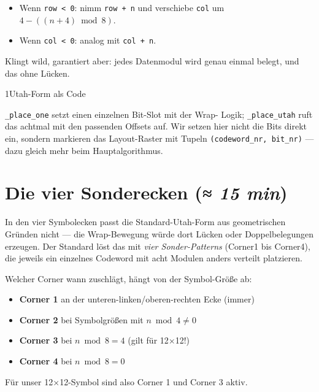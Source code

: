 \begin{itemize}
\item Wenn \texttt{row < 0}: nimm \texttt{row + n} und verschiebe
  \texttt{col} um $4 - ((n+4) \bmod 8)$.
\item Wenn \texttt{col < 0}: analog mit \texttt{col + n}.
\end{itemize}

Klingt wild, garantiert aber: jedes Datenmodul wird genau einmal
belegt, und das ohne Lücken.

\begin{pythoneinheit}{1}{Utah-Form als Code}

\texttt{\_place\_one} setzt einen einzelnen Bit-Slot mit der Wrap-
Logik; \texttt{\_place\_utah} ruft das achtmal mit den passenden
Offsets auf. Wir setzen hier nicht die Bits direkt ein, sondern
markieren das Layout-Raster mit Tupeln \texttt{(codeword\_nr, bit\_nr)}
— dazu gleich mehr beim Hauptalgorithmus.
\end{pythoneinheit}

\section{Die vier Sonderecken \normalfont(\textit{≈ 15 min})}

In den vier Symbolecken passt die Standard-Utah-Form aus geometrischen
Gründen nicht — die Wrap-Bewegung würde dort Lücken oder
Doppelbelegungen erzeugen. Der Standard löst das mit \emph{vier
Sonder-Patterns} (Corner1 bis Corner4), die jeweils ein einzelnes
Codeword mit acht Modulen anders verteilt platzieren.

Welcher Corner wann zuschlägt, hängt von der Symbol-Größe ab:

\begin{itemize}
\item \textbf{Corner 1} an der unteren-linken/oberen-rechten Ecke
  (immer)
\item \textbf{Corner 2} bei Symbolgrößen mit $n \bmod 4 \ne 0$
\item \textbf{Corner 3} bei $n \bmod 8 = 4$ (gilt für 12$\times$12!)
\item \textbf{Corner 4} bei $n \bmod 8 = 0$
\end{itemize}

Für unser 12$\times$12-Symbol sind also Corner 1 und Corner 3 aktiv.

